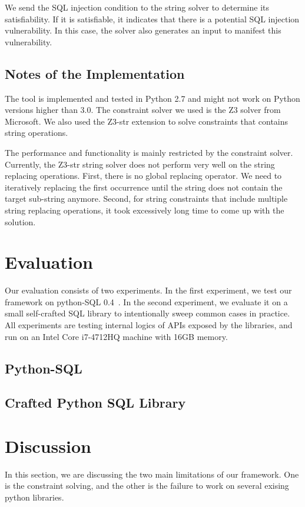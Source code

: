 \documentclass[conference]{IEEEtran}
\begin{document}
We send the SQL injection condition to the string solver to determine its satisfiability. If it is satisfiable, it indicates that there is a potential SQL injection vulnerability. In this case, the solver also generates an input to manifest this vulnerability.

\subsection{Notes of the Implementation}

The tool is implemented and tested in Python 2.7 and might not work on Python versions higher than 3.0.
The constraint solver we used is the Z3 solver from Microsoft. We also used the Z3-str extension to solve constraints that contains string operations.

The performance and functionality is mainly restricted by the constraint solver. Currently, the Z3-str string solver does not perform very well on the string replacing operations. First, there is no global replacing operator. We need to iteratively replacing the first occurrence until the string does not contain the target sub-string anymore. Second, for string constraints that include multiple string replacing operations, it took excessively long time to come up with the solution.


\section{Evaluation}
\label{evaluation}
Our evaluation consists of two experiments. In the first experiment, we test our framework on python-SQL 0.4~\cite{python-sql}. In the second experiment, we evaluate it on a small self-crafted SQL library to intentionally sweep common cases in practice. All experiments are testing internal logics of APIs exposed by the libraries, and run on an Intel Core i7-4712HQ machine with 16GB memory.

\subsection{Python-SQL}
\label{python-sql}

\subsection{Crafted Python SQL Library}
\label{crafted-sql}

\section{Discussion}
\label{discussion}
In this section, we are discussing the two main limitations of our framework. One is the constraint solving, and the other is the failure to work on several exising python libraries.
\end{document}
